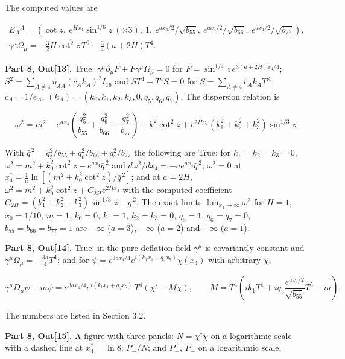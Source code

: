 \documentclass[10pt]{article}
\makeatletter
\newcommand\keepnext{\par\nopagebreak\@nobreaktrue\everypar{\@nobreakfalse\everypar{}}}
\makeatother
\begin{document}
The computed values are\keepnext


\[
\begin{gathered}
E_A{}^A = \left(\cot z,\ e^{Hx_4}\sin^{1/6}z\ (\times3),\ 1,\ e^{ax_4/2}/\sqrt{b_{55}},\ e^{ax_4/2}/\sqrt{b_{66}},\ e^{ax_4/2}/\sqrt{b_{77}}\right), \\
\gamma^\mu\Omega_\mu = -\frac32H\cot^2 z\,T^0 - \frac34(a + 2H)T^4 .
\end{gathered}
\]

\textbf{Part 8, Out[13].} True: $\gamma^\mu\partial_\mu F + F\gamma^\mu\Omega_\mu = 0$ for $F = \sin^{1/4}z\,e^{3(a+2H)x_4/4}$; $S^2 = \sum_{A\ne4}\eta_{AA}(c_Ak_A)^2I_{16}$ and $ST^4 + T^4S = 0$ for $S = \sum_{A\ne4}c_Ak_AT^A$, $c_A = 1/e_A$, $(k_A) = (k_0, k_1, k_2, k_3, 0, q_5, q_6, q_7)$. The dispersion relation is\keepnext


\[
\omega^2 = m^2 - e^{ax_4}\left(\frac{q_5^2}{b_{55}} + \frac{q_6^2}{b_{66}} + \frac{q_7^2}{b_{77}}\right) + k_0^2\cot^2 z + e^{2Hx_4}(k_1^2 + k_2^2 + k_3^2)\sin^{1/3}z .
\]

With $\bar q^{\,2} = q_5^2/b_{55} + q_6^2/b_{66} + q_7^2/b_{77}$ the following are True: for $k_1 = k_2 = k_3 = 0$, $\omega^2 = m^2 + k_0^2\cot^2 z - e^{ax_4}\bar q^{\,2}$ and $d\omega^2/dx_4 = -ae^{ax_4}\bar q^{\,2}$; $\omega^2 = 0$ at $x_4^* = \frac1a\ln[(m^2 + k_0^2\cot^2 z)/\bar q^{\,2}]$; and at $a = 2H$, $\omega^2 = m^2 + k_0^2\cot^2 z + C_{2H}e^{2Hx_4}$ with the computed coefficient $C_{2H} = (k_1^2 + k_2^2 + k_3^2)\sin^{1/3}z - \bar q^{\,2}$. The exact limits $\lim_{x_4\to\infty}\omega^2$ for $H = 1$, $x_0 = 1/10$, $m = 1$, $k_0 = 0$, $k_1 = 1$, $k_2 = k_3 = 0$, $q_5 = 1$, $q_6 = q_7 = 0$, $b_{55} = b_{66} = b_{77} = 1$ are $-\infty$ ($a = 3$), $-\infty$ ($a = 2$) and $+\infty$ ($a = 1$).


\textbf{Part 8, Out[14].} True: in the pure deflation field $\gamma^\mu$ is covariantly constant and $\gamma^\mu\Omega_\mu = -\frac{3a}{4}T^4$; and for $\psi = e^{3ax_4/4}e^{i(k_1x_1 + q_5x_5)}\chi(x_4)$ with arbitrary $\chi$,\keepnext


\[
\gamma^\mu D_\mu\psi - m\psi = e^{3ax_4/4}e^{i(k_1x_1 + q_5x_5)}\,T^4(\chi' - M\chi), \qquad M = T^4\left(ik_1T^1 + iq_5\frac{e^{ax_4/2}}{\sqrt{b_{55}}}T^5 - m\right).
\]

The numbers are listed in Section 3.2.


\textbf{Part 8, Out[15].} A figure with three panels: $N = \chi^\dagger\chi$ on a logarithmic scale with a dashed line at $x_4^* = \ln 8$; $P_-/N$; and $P_+$, $P_-$ on a logarithmic scale.
\end{document}
